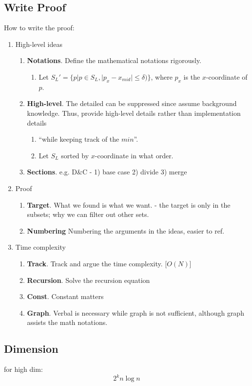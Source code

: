 \documentclass[a4paper]{report}
\begin{document}
\subsection{Write Proof}
How to write the proof:
\begin{enumerate}
\item High-level ideas
\begin{enumerate} 
\item \textbf{Notations}. Define the mathematical notations rigorously. 
\begin{enumerate}
\item Let $S_L' = \{p|p\in S_L, |p_{x}-x_{mid}|\leq \delta) \}$, where $p_x$ is the
$x$-coordinate of $p$.
\end{enumerate}
\item  \textbf{High-level}. The detailed can be suppressed since assume background knowledge. Thus, provide high-level details rather than implementation details
\begin{enumerate}
\item ``while keeping track of the $min$''.  
\item Let $S_L$ sorted by $x$-coordinate in
what order.
\end{enumerate}
\item \textbf{Sections}. e.g. D\&C - 1) base case 2) divide 3) merge 
\end{enumerate}
\item Proof
\begin{enumerate}
\item \textbf{Target}. What we found is what we want. - the target is only in the subsets; why we can
filter out other sets.
\item \textbf{Numbering} Numbering the arguments in the ideas, easier to ref.
\end{enumerate}
\item Time complexity
\begin{enumerate}
\item \textbf{Track}. Track and argue the time complexity. [$O(N)$]
\item \textbf{Recursion}. Solve the recursion equation 
\item \textbf{Const}. Constant matters
\item \textbf{Graph}. Verbal is necessary while graph is not sufficient, although graph assists the math notations. 
\end{enumerate}
\end{enumerate}

\subsection{Dimension}
for high dim:
$$
2^k n \log n 
$$
\end{document}
